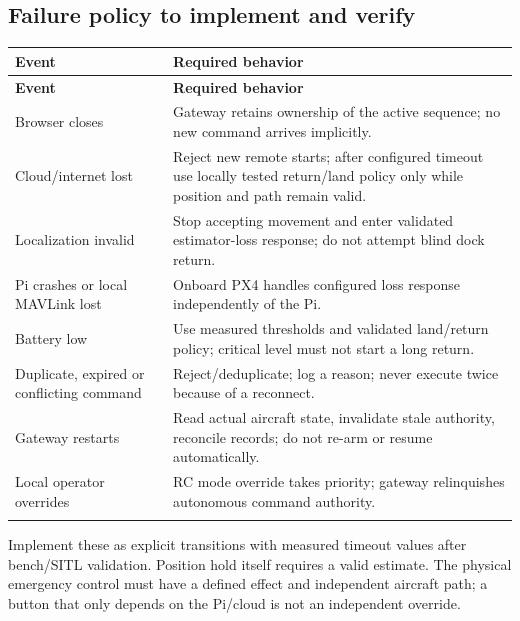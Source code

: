 \documentclass[10pt,letterpaper]{article}
\begin{document}
\subsection{Failure policy to implement and verify}
\begingroup\small\begin{longtable}{P{1.764in}P{5.020in}}
\toprule{}\textbf{Event} & \textbf{Required behavior} \\\midrule\endfirsthead
\toprule{}\textbf{Event} & \textbf{Required behavior} \\\midrule\endhead
\bottomrule\endfoot
Browser closes & Gateway retains ownership of the active sequence; no new command arrives implicitly. \\ \addlinespace[2pt]
Cloud/internet lost & Reject new remote starts; after configured timeout use locally tested return/land policy only while position and path remain valid. \\ \addlinespace[2pt]
Localization invalid & Stop accepting movement and enter validated estimator-loss response; do not attempt blind dock return. \\ \addlinespace[2pt]
Pi crashes or local MAVLink lost & Onboard PX4 handles configured loss response independently of the Pi. \\ \addlinespace[2pt]
Battery low & Use measured thresholds and validated land/return policy; critical level must not start a long return. \\ \addlinespace[2pt]
Duplicate, expired or conflicting command & Reject/deduplicate; log a reason; never execute twice because of a reconnect. \\ \addlinespace[2pt]
Gateway restarts & Read actual aircraft state, invalidate stale authority, reconcile records; do not re-arm or resume automatically. \\ \addlinespace[2pt]
Local operator overrides & RC mode override takes priority; gateway relinquishes autonomous command authority. \\ \addlinespace[2pt]
\end{longtable}\endgroup
Implement these as explicit transitions with measured timeout values after bench/SITL validation. Position hold itself requires a valid estimate. The physical emergency control must have a defined effect and independent aircraft path; a button that only depends on the Pi/cloud is not an independent override.
\end{document}
